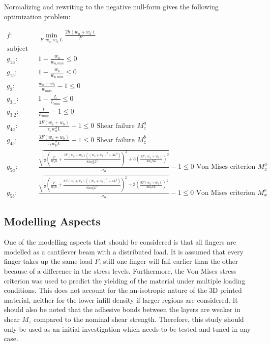 Normalizing and rewriting to the negative null-form gives the following optimization problem:

\begin{align*}
	f: & \min_{F, {w_a}, {w_b}. L}  \frac{2h \left(w_a + w_b\right)}{F} \nonumber \\
	\text{subject to:} & \nonumber \\
	g_{1a}:& 1 - \frac{w_a}{w_{a,min}}  \le 0 \\
	g_{1b}:& 1 - \frac{w_b}{w_{b,min}}  \le 0 \\
	g_2:& \frac{w_a + w_b}{w_{max}}  - 1 \le 0 \\
	g_{3.1}:& 1 - \frac{L}{L_{min}} \le 0 \\
	g_{3.2}:&\frac{L}{L_{max}} - 1  \le 0 \\
	g_{4a}: & \frac{ 3 F \left(w_a + w_b \right) }{ \tau_a w_a ^2 L} - 1 \le 0					\text{ Shear failure } M_z^a \\
	g_{4b}: & \frac{ 3 F \left(w_a + w_b \right) }{ \tau_b w_b ^2 L} - 1 \le 0					\text{ Shear failure } M_z^b \\
	g_{5a}:& \frac{\sqrt{\frac{1}{2} \left( \frac{F}{w_a  h} + 	\frac{ 3 F \left(w_a + w_b \right) \left(\left(w_a + w_b \right) ^2 + 4L^2 \right)  }{ 8h w_a^2 L^2 }   \right)^2+ 3\left(	\frac{ 3 F \left(w_a + w_b \right) }{ 4  w_a h L}  \right) ^2}	} { \sigma_a} - 1	\le 0	\text{ Von Mises criterion } M_x^a \\
	g_{5b}:& \frac{\sqrt{\frac{1}{2} \left( \frac{F}{w_b  h} + 	\frac{ 3 F \left(w_a + w_b \right) \left(\left(w_a + w_b \right) ^2 + 4L^2 \right)  }{ 8h w_b^2 L^2 }   \right)^2+ 3\left(	\frac{ 3 F \left(w_a + w_b \right) }{ 4  w_b h L}  \right) ^2}	} { \sigma_b} - 1	\le 0	\text{ Von Mises criterion } M_x^a 
\end{align*}



\subsection{Modelling Aspects}
One of the modelling aspects that should be considered is that all fingers are modelled as a cantilever beam with a distributed load. It is assumed that every finger takes up the same load $F$, still one finger will fail earlier than the other because of a difference in the stress levels. Furthermore, the Von Mises stress criterion was used to predict the yielding of the material under multiple loading conditions. This does not account for the an-isotropic nature of the 3D printed material, neither for the lower infill density if larger regions are considered. It should also be noted that the adhesive bonds between the layers are weaker in shear $M_z$ compared to the nominal shear strength. Therefore, this study should only be used as an initial investigation which needs to be tested and tuned in any case.

